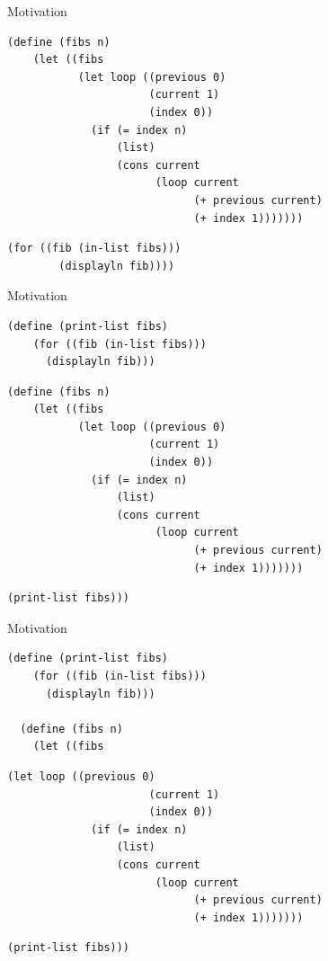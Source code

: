 \documentclass[xcolor=dvipsnames, 14pt]{beamer}
\begin{document}
\begin{frame}[fragile]{Motivation}
\begin{Verbatim}[fontsize=\footnotesize]
  (define (fibs n)
    (let ((fibs
           (let loop ((previous 0)
                      (current 1)
                      (index 0))
             (if (= index n)
                 (list)
                 (cons current
                       (loop current
                             (+ previous current)
                             (+ index 1)))))))
\end{Verbatim}
\begin{Verbatim}[frame=single, rulecolor=\color{red}, fontsize=\footnotesize]
      (for ((fib (in-list fibs)))
        (displayln fib))))
\end{Verbatim}
\end{frame}
\begin{frame}[fragile]{Motivation}

\begin{Verbatim}[frame=single, rulecolor=\color{red}, fontsize=\footnotesize]
  (define (print-list fibs)
    (for ((fib (in-list fibs)))
      (displayln fib)))
\end{Verbatim}
\begin{Verbatim}[fontsize=\footnotesize]
  (define (fibs n)
    (let ((fibs
           (let loop ((previous 0)
                      (current 1)
                      (index 0))
             (if (= index n)
                 (list)
                 (cons current
                       (loop current
                             (+ previous current)
                             (+ index 1)))))))
\end{Verbatim}
\begin{Verbatim}[frame=single, rulecolor=\color{red}, fontsize=\footnotesize]
      (print-list fibs)))
\end{Verbatim}
\end{frame}
\begin{frame}[fragile]{Motivation}
\begin{Verbatim}[fontsize=\footnotesize]
  (define (print-list fibs)
    (for ((fib (in-list fibs)))
      (displayln fib)))

  (define (fibs n)
    (let ((fibs
    \end{Verbatim}
\begin{Verbatim}[frame=single, rulecolor=\color{red},fontsize=\footnotesize]
           (let loop ((previous 0)
                      (current 1)
                      (index 0))
             (if (= index n)
                 (list)
                 (cons current
                       (loop current
                             (+ previous current)
                             (+ index 1)))))))
\end{Verbatim}
\begin{Verbatim}[fontsize=\footnotesize]
      (print-list fibs)))
\end{Verbatim}
\end{frame}
\end{document}
